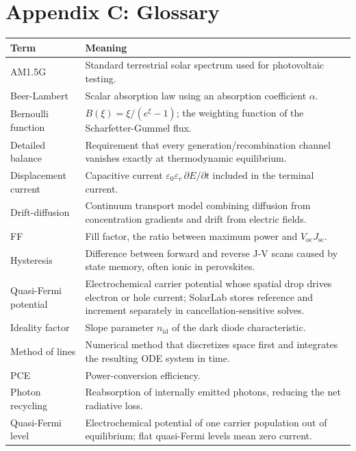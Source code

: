 \documentclass[
  11pt,
  american,
]{report}
\begin{document}
\hypertarget{appendix-c-glossary}{%
\chapter{Appendix C: Glossary}\label{appendix-c-glossary}}

\begin{longtable}[]{@{}
  >{\raggedright\arraybackslash}p{}
  >{\raggedright\arraybackslash}p{}@{}}
\toprule
Term & Meaning \\
\midrule
\endhead
AM1.5G & Standard terrestrial solar spectrum used for photovoltaic
testing. \\
Beer-Lambert & Scalar absorption law using an absorption coefficient
\(\alpha\). \\
Bernoulli function & \(B(\xi)=\xi/(e^{\xi}-1)\); the weighting function
of the Scharfetter-Gummel flux. \\
Detailed balance & Requirement that every generation/recombination
channel vanishes exactly at thermodynamic equilibrium. \\
Displacement current & Capacitive current
\(\varepsilon_0\varepsilon_r\,\partial E/\partial t\) included in the
terminal current. \\
Drift-diffusion & Continuum transport model combining diffusion from
concentration gradients and drift from electric fields. \\
FF & Fill factor, the ratio between maximum power and
\(V_\mathrm{oc}J_\mathrm{sc}\). \\
Hysteresis & Difference between forward and reverse J-V scans caused by
state memory, often ionic in perovskites. \\
Quasi-Fermi potential & Electrochemical carrier potential whose spatial
drop drives electron or hole current; SolarLab stores reference and
increment separately in cancellation-sensitive solves. \\
Ideality factor & Slope parameter \(n_\mathrm{id}\) of the dark diode
characteristic. \\
Method of lines & Numerical method that discretizes space first and
integrates the resulting ODE system in time. \\
PCE & Power-conversion efficiency. \\
Photon recycling & Reabsorption of internally emitted photons, reducing
the net radiative loss. \\
Quasi-Fermi level & Electrochemical potential of one carrier population
out of equilibrium; flat quasi-Fermi levels mean zero current. \\

\end{longtable}
\end{document}
